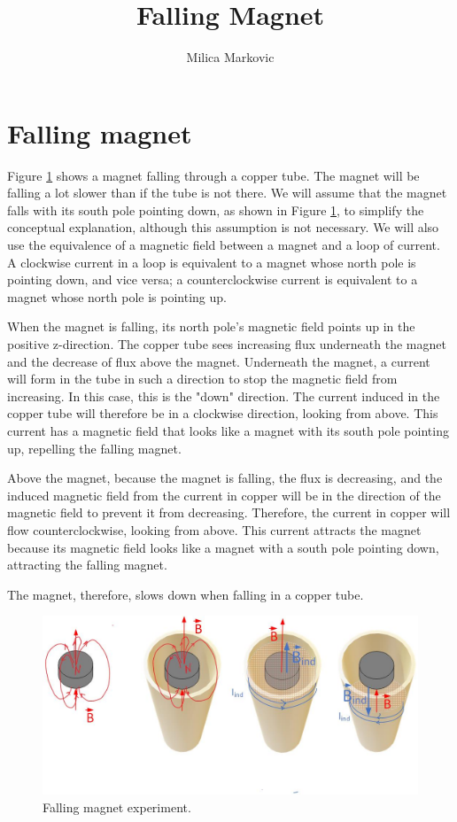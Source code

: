 \documentclass{ximera}
\title{Falling Magnet}
\author{Milica Markovic}
\begin{document}
  
\begin{abstract}  

\end{abstract}  
\maketitle    


\section{Falling magnet}


Figure \ref{fig:FallingMagnet} shows a magnet falling through a copper tube. The magnet will be falling a lot slower than if the tube is not there. We will assume that the magnet falls with its south pole pointing down, as shown in Figure \ref{fig:FallingMagnet}, to simplify the conceptual explanation, although this assumption is not necessary. We will also use the equivalence of a magnetic field between a magnet and a loop of current. A clockwise current in a loop is equivalent to a magnet whose north pole is pointing down, and vice versa; a counterclockwise current is equivalent to a magnet whose north pole is pointing up.

When the magnet is falling, its north pole's magnetic field points up in the positive z-direction. The copper tube sees increasing flux underneath the magnet and the decrease of flux above the magnet. Underneath the magnet, a current will form in the tube in such a direction to stop the magnetic field from increasing. In this case, this is the "down" direction. The current induced in the copper tube will therefore be in a clockwise direction, looking from above. This current has a magnetic field that looks like a magnet with its south pole pointing up, repelling the falling magnet. 


Above the magnet, because the magnet is falling, the flux is decreasing, and the induced magnetic field from the current in copper will be in the direction of the magnetic field to prevent it from decreasing. Therefore, the current in copper will flow counterclockwise, looking from above. This current attracts the magnet because its magnetic field looks like a magnet with a south pole pointing down, attracting the falling magnet. 

The magnet, therefore, slows down when falling in a copper tube.

\begin{figure}[htbp]
\begin{center}
\includegraphics[scale=0.5]{../jpg/fallingMagnet.jpg}
\end{center}
\caption{Falling magnet experiment.}
\label{fig:FallingMagnet}
\end{figure}
\end{document}
